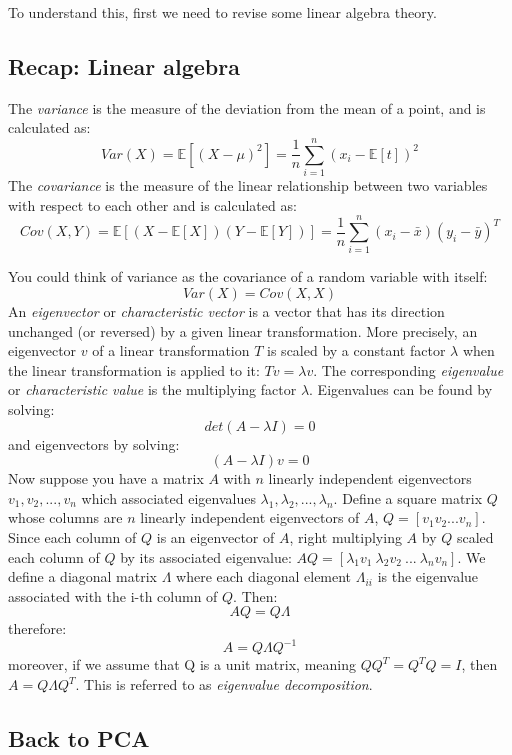 \documentclass{article}
\begin{document}
To understand this, first we need to revise some linear algebra theory.

\subsection{Recap: Linear algebra}\label{recap-linear-algebra}

The \emph{variance} is the measure of the deviation from the mean of a
point, and is calculated as:
\[Var(X)= \mathbb{E}[(X-\mu)^2] =  \frac{1}{n}\sum_{i=1}^n (x_i - \mathbb{E}[t])^2\]
The \emph{covariance} is the measure of the linear relationship between
two variables with respect to each other and is calculated as:
\[Cov(X, Y) = \mathbb{E}[(X- \mathbb{E}[X])(Y - \mathbb{E}[Y])]= \frac{1}{n}\sum_{i=1}^n (x_i - \bar x)(y_i -\bar y)^T\]

You could think of variance as the covariance of a random variable with
itself: \[Var(X)=Cov(X, X)\] An \emph{eigenvector} or
\emph{characteristic vector} is a vector that has its direction
unchanged (or reversed) by a given linear transformation. More
precisely, an eigenvector \(v\) of a linear transformation \(T\) is
scaled by a constant factor \(\lambda\) when the linear transformation
is applied to it: \(Tv = \lambda v\). The corresponding
\emph{eigenvalue} or \emph{characteristic value} is the multiplying
factor \(\lambda\). Eigenvalues can be found by solving:
\[det(A-\lambda I) = 0\] and eigenvectors by solving:
\[(A-\lambda I)v =0\] Now suppose you have a matrix \(A\) with \(n\)
linearly independent eigenvectors \(v_1, v_2, ..., v_n\) which
associated eigenvalues \(\lambda _1, \lambda _2, ..., \lambda _n\).
Define a square matrix \(Q\) whose columns are \(n\) linearly
independent eigenvectors of \(A\), \(Q=[v_1 v_2 ... v_n]\). Since each
column of \(Q\) is an eigenvector of \(A\), right multiplying \(A\) by
\(Q\) scaled each column of \(Q\) by its associated eigenvalue:
\(AQ = [\lambda_1 v_1\ \lambda_2 v_2\ ... \ \lambda _n v_n]\). We define
a diagonal matrix \(\Lambda\) where each diagonal element
\(\Lambda _{ii}\) is the eigenvalue associated with the i-th column of
\(Q\). Then: \[AQ=Q\Lambda\] therefore: \[A = Q\Lambda Q^{-1}\]
moreover, if we assume that Q is a unit matrix, meaning
\(QQ^T = Q^T Q = I\), then \(A = Q\Lambda Q^T\). This is referred to as
\emph{eigenvalue decomposition}.

\subsection{Back to PCA}\label{back-to-pca}
\end{document}
